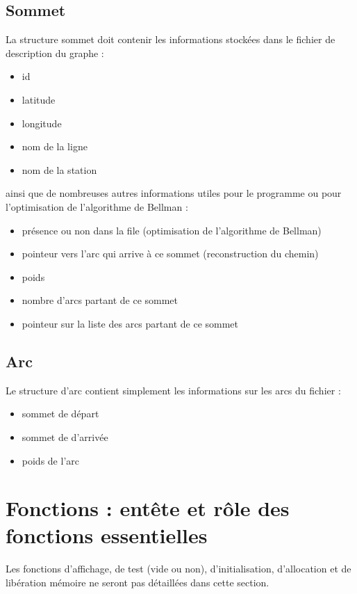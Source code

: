 \documentclass{report}
\begin{document}
\subsection{Sommet}

La structure sommet doit contenir les informations stockées dans le fichier de description du graphe : 
\begin{itemize}
\item id
\item latitude
\item longitude
\item nom de la ligne
\item nom de la station
\end{itemize}
\bigskip
ainsi que de nombreuses autres informations utiles pour le programme ou pour l’optimisation de l’algorithme de Bellman :
\begin{itemize}

\item présence ou non dans la file (optimisation de l’algorithme de Bellman)
\item pointeur vers l'arc qui arrive à ce sommet (reconstruction du chemin)
\item poids
\item nombre d’arcs partant de ce sommet
\item pointeur sur la liste des arcs partant de ce sommet

\end{itemize}
\subsection{Arc}

Le structure d’arc contient simplement les informations sur les arcs du fichier :
\begin{itemize}

\item sommet de départ
\item sommet de d'arrivée
\item poids de l’arc

\end{itemize}

\section{Fonctions : entête et rôle des fonctions essentielles}

Les fonctions d’affichage, de test (vide ou non), d’initialisation, d’allocation et de libération mémoire ne seront pas détaillées dans cette section.
\end{document}
